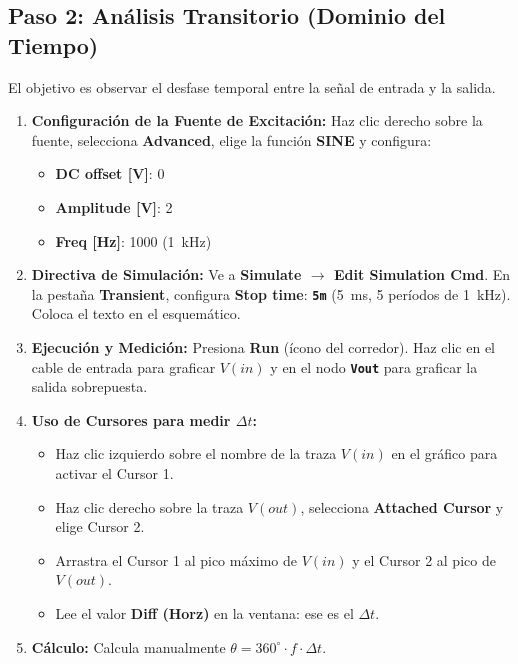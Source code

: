 \documentclass[11pt,a4paper]{article}
\newcommand{\tecla}[1]{\colorbox{gray!20}{\texttt{\footnotesize\textbf{#1}}}}
\newcommand{\menu}[1]{\textbf{\textsf{#1}}}
\begin{document}
\subsection*{Paso 2: Análisis Transitorio (Dominio del Tiempo)}
El objetivo es observar el desfase temporal entre la señal de entrada y la salida.
\begin{enumerate}
    \item \textbf{Configuración de la Fuente de Excitación:} Haz clic derecho sobre la fuente, selecciona \menu{Advanced}, elige la función \menu{SINE} y configura:
    \begin{itemize}[label=\raisebox{0.25ex}{\tiny$\bullet$}]
        \item \menu{DC offset [V]}: 0
        \item \menu{Amplitude [V]}: 2
        \item \menu{Freq [Hz]}: 1000 (\qty{1}{\kilo\hertz})
    \end{itemize}
    \item \textbf{Directiva de Simulación:} Ve a \menu{Simulate $\rightarrow$ Edit Simulation Cmd}. En la pestaña \menu{Transient}, configura \menu{Stop time}: \tecla{5m} (\qty{5}{\milli\second}, 5 períodos de \qty{1}{\kilo\hertz}). Coloca el texto en el esquemático.
    \item \textbf{Ejecución y Medición:} Presiona \menu{Run} (ícono del corredor). Haz clic en el cable de entrada para graficar $V(in)$ y en el nodo \tecla{Vout} para graficar la salida sobrepuesta.
    \item \textbf{Uso de Cursores para medir $\Delta t$:}
    \begin{itemize}[label=\raisebox{0.25ex}{\tiny$\bullet$}]
        \item Haz clic izquierdo sobre el nombre de la traza $V(in)$ en el gráfico para activar el Cursor 1.
        \item Haz clic derecho sobre la traza $V(out)$, selecciona \menu{Attached Cursor} y elige Cursor 2.
        \item Arrastra el Cursor 1 al pico máximo de $V(in)$ y el Cursor 2 al pico de $V(out)$. 
        \item Lee el valor \menu{Diff (Horz)} en la ventana: ese es el $\Delta t$.
    \end{itemize}
    \item \textbf{Cálculo:} Calcula manualmente $\theta = 360^\circ \cdot f \cdot \Delta t$.
\end{enumerate}
\end{document}
